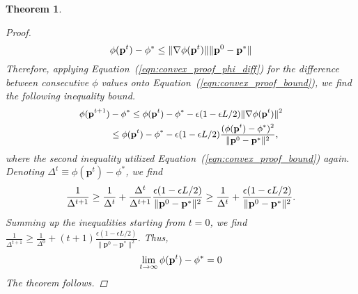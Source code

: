 \documentclass[conference]{IEEEtran}
\newcommand{\1}[1]{\mathds{1}\left[#1\right]}
\theoremstyle{plain}
\newtheorem{theorem}{Theorem}
\newcommand*{\defeq}{\equiv}
\begin{document}
\begin{theorem}
{\begin{proof}
        \begin{equation}\small
            \label{eqn:convex_proof_bound}
            \phi(\mathbf{p}^t) - \phi^* \leq \lVert\nabla\phi(\mathbf{p}^t)\rVert\lVert\mathbf{p}^0-\mathbf{p}^*\rVert
        \end{equation}
        Therefore, applying Equation~(\ref{eqn:convex_proof_phi_diff}) for the difference between consecutive $\phi$ values onto Equation~(\ref{eqn:convex_proof_bound}), we find the following inequality bound.
        \begin{equation}\small
        \begin{split}
            \phi(\mathbf{p}^{t+1}) &- \phi^* \leq \phi(\mathbf{p}^t) - \phi^* - \epsilon(1-\epsilon L/2)\lVert\nabla\phi(\mathbf{p}^t)\rVert^2
            \\&\leq 
            \phi(\mathbf{p}^t) - \phi^* - \epsilon(1-\epsilon L/2)
            \frac{(\phi(\mathbf{p}^t) - \phi^*)^2}{\lVert\mathbf{p}^0-\mathbf{p}^*\rVert^2},
        \end{split}
        \end{equation}
        where the second inequality utilized Equation~(\ref{eqn:convex_proof_bound}) again. Denoting $\Delta^t\defeq\phi(\mathbf{p}^t) - \phi^*$, we find
        \begin{equation}\small
            \frac{1}{\Delta^{t+1}} \geq \frac{1}{\Delta^{t}}+\frac{\Delta^{t}}{\Delta^{t+1}} \frac{\epsilon(1-\epsilon L/2)}{\lVert \mathbf{p}^0 - \mathbf{p}^*\rVert^2} \geq \frac{1}{\Delta^{t}}+ \frac{\epsilon(1-\epsilon L/2)}{\lVert \mathbf{p}^0 - \mathbf{p}^*\rVert^2}.
        \end{equation}
        Summing up the inequalities starting from $t=0$, we find $\frac{1}{\Delta^{t+1}} \geq \frac{1}{\Delta^{0}}+(t+1)\frac{\epsilon(1-\epsilon L/2)}{\lVert \mathbf{p}^0 - \mathbf{p}^*\rVert^2}$. Thus,
        \begin{equation}\small
            \lim_{t\rightarrow \infty} \phi(\mathbf{p}^t) - \phi^*=0
        \end{equation}
        The theorem follows.
    \end{proof}
    }
\end{theorem}
\end{document}
